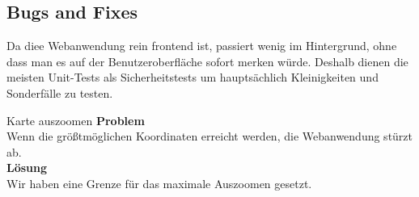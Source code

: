 \subsection{Bugs and Fixes}

Da diee Webanwendung rein frontend ist, passiert wenig im Hintergrund, ohne dass man es auf der Benutzeroberfläche sofort merken würde. Deshalb dienen die meisten Unit-Tests als Sicherheitstests um hauptsächlich Kleinigkeiten und Sonderfälle zu testen. 

\begin{Bug}{Karte auszoomen}
    \textbf{Problem}\\
    Wenn die größtmöglichen Koordinaten erreicht werden, die Webanwendung stürzt ab.\\
    \linebreak
    \textbf{Lösung}\\
    Wir haben eine Grenze für das maximale Auszoomen gesetzt.\\
\end{Bug}


